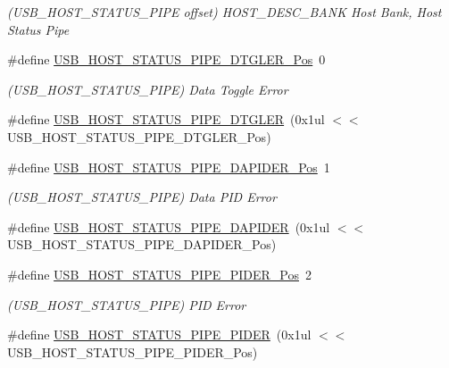 \begin{DoxyCompactItemize}
\begin{DoxyCompactList}\small\item\em (U\+S\+B\+\_\+\+H\+O\+S\+T\+\_\+\+S\+T\+A\+T\+U\+S\+\_\+\+P\+I\+PE offset) H\+O\+S\+T\+\_\+\+D\+E\+S\+C\+\_\+\+B\+A\+NK Host Bank, Host Status Pipe \end{DoxyCompactList}\item 
\#define \mbox{\hyperlink{group___s_a_m_d21___u_s_b_ga93d07e3d08d1fb4add66e964989ca46d}{U\+S\+B\+\_\+\+H\+O\+S\+T\+\_\+\+S\+T\+A\+T\+U\+S\+\_\+\+P\+I\+P\+E\+\_\+\+D\+T\+G\+L\+E\+R\+\_\+\+Pos}}~0
\begin{DoxyCompactList}\small\item\em (U\+S\+B\+\_\+\+H\+O\+S\+T\+\_\+\+S\+T\+A\+T\+U\+S\+\_\+\+P\+I\+PE) Data Toggle Error \end{DoxyCompactList}\item 
\#define \mbox{\hyperlink{group___s_a_m_d21___u_s_b_gaf3429010f4d20e6aef1e800e457b51a3}{U\+S\+B\+\_\+\+H\+O\+S\+T\+\_\+\+S\+T\+A\+T\+U\+S\+\_\+\+P\+I\+P\+E\+\_\+\+D\+T\+G\+L\+ER}}~(0x1ul $<$$<$ U\+S\+B\+\_\+\+H\+O\+S\+T\+\_\+\+S\+T\+A\+T\+U\+S\+\_\+\+P\+I\+P\+E\+\_\+\+D\+T\+G\+L\+E\+R\+\_\+\+Pos)
\item 
\#define \mbox{\hyperlink{group___s_a_m_d21___u_s_b_gafa8f2dc77b052cf914a9ce0cb42fb969}{U\+S\+B\+\_\+\+H\+O\+S\+T\+\_\+\+S\+T\+A\+T\+U\+S\+\_\+\+P\+I\+P\+E\+\_\+\+D\+A\+P\+I\+D\+E\+R\+\_\+\+Pos}}~1
\begin{DoxyCompactList}\small\item\em (U\+S\+B\+\_\+\+H\+O\+S\+T\+\_\+\+S\+T\+A\+T\+U\+S\+\_\+\+P\+I\+PE) Data P\+ID Error \end{DoxyCompactList}\item 
\#define \mbox{\hyperlink{group___s_a_m_d21___u_s_b_gaddb2bce5092ee53c61710f9893baa788}{U\+S\+B\+\_\+\+H\+O\+S\+T\+\_\+\+S\+T\+A\+T\+U\+S\+\_\+\+P\+I\+P\+E\+\_\+\+D\+A\+P\+I\+D\+ER}}~(0x1ul $<$$<$ U\+S\+B\+\_\+\+H\+O\+S\+T\+\_\+\+S\+T\+A\+T\+U\+S\+\_\+\+P\+I\+P\+E\+\_\+\+D\+A\+P\+I\+D\+E\+R\+\_\+\+Pos)
\item 
\#define \mbox{\hyperlink{group___s_a_m_d21___u_s_b_gaba9eac7b3c25d627e8a4e6918270ea11}{U\+S\+B\+\_\+\+H\+O\+S\+T\+\_\+\+S\+T\+A\+T\+U\+S\+\_\+\+P\+I\+P\+E\+\_\+\+P\+I\+D\+E\+R\+\_\+\+Pos}}~2
\begin{DoxyCompactList}\small\item\em (U\+S\+B\+\_\+\+H\+O\+S\+T\+\_\+\+S\+T\+A\+T\+U\+S\+\_\+\+P\+I\+PE) P\+ID Error \end{DoxyCompactList}\item 
\#define \mbox{\hyperlink{group___s_a_m_d21___u_s_b_ga63b0523dcd5148af4e88ba1f7365bf21}{U\+S\+B\+\_\+\+H\+O\+S\+T\+\_\+\+S\+T\+A\+T\+U\+S\+\_\+\+P\+I\+P\+E\+\_\+\+P\+I\+D\+ER}}~(0x1ul $<$$<$ U\+S\+B\+\_\+\+H\+O\+S\+T\+\_\+\+S\+T\+A\+T\+U\+S\+\_\+\+P\+I\+P\+E\+\_\+\+P\+I\+D\+E\+R\+\_\+\+Pos)
$$
\end{DoxyCompactItemize}
